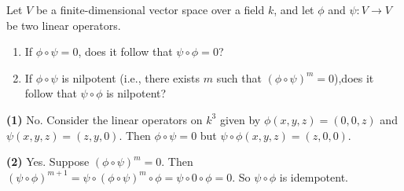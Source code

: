 \begin{problem}
Let $V$ be a finite-dimensional vector space over a field $k$, and let $\phi$ and $\psi:V\to V$ be two linear operators.
\begin{enumerate}
  \item If $\phi\circ \psi=0$, does it follow that $\psi\circ \phi=0$?
  \item If $\phi\circ\psi$ is nilpotent (i.e., there exists $m$ such that ${(\phi\circ \psi)}^m=0$),does it follow that $\psi\circ \phi$ is nilpotent?
\end{enumerate}
\end{problem}
\textbf{(1)} No. Consider the linear operators on $k^3$ given by $\phi(x,y,z)=(0,0,z)$ and $\psi(x,y,z)=(z,y,0)$. Then $\phi\circ \psi=0$ but $\psi\circ \phi(x,y,z)=(z,0,0)$.     

\textbf{(2)} Yes. Suppose ${(\phi\circ \psi)}^m=0$. Then ${(\psi\circ\phi)}^{m+1}=\psi\circ{(\phi\circ\psi)}^{m}\circ \phi = \psi \circ 0 \circ \phi = 0$. So $\psi\circ\phi$ is idempotent.
 